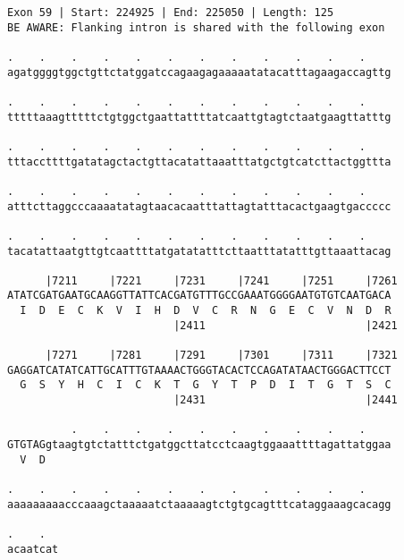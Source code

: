 \documentclass{article}
\begin{document}
\newpage
\begin{Verbatim}
Exon 59 | Start: 224925 | End: 225050 | Length: 125
BE AWARE: Flanking intron is shared with the following exon
 
.    .    .    .    .    .    .    .    .    .    .    .    
agatggggtggctgttctatggatccagaagagaaaaatatacatttagaagaccagttg
  
.    .    .    .    .    .    .    .    .    .    .    .    
tttttaaagtttttctgtggctgaattattttatcaattgtagtctaatgaagttatttg
  
.    .    .    .    .    .    .    .    .    .    .    .    
tttaccttttgatatagctactgttacatattaaatttatgctgtcatcttactggttta
  
.    .    .    .    .    .    .    .    .    .    .    .    
atttcttaggcccaaaatatagtaacacaatttattagtatttacactgaagtgaccccc
  
.    .    .    .    .    .    .    .    .    .    .    .    
tacatattaatgttgtcaattttatgatatatttcttaatttatatttgttaaattacag
  
      |7211     |7221     |7231     |7241     |7251     |7261
ATATCGATGAATGCAAGGTTATTCACGATGTTTGCCGAAATGGGGAATGTGTCAATGACA
  I  D  E  C  K  V  I  H  D  V  C  R  N  G  E  C  V  N  D  R
                          |2411                         |2421
  
      |7271     |7281     |7291     |7301     |7311     |7321
GAGGATCATATCATTGCATTTGTAAAACTGGGTACACTCCAGATATAACTGGGACTTCCT
  G  S  Y  H  C  I  C  K  T  G  Y  T  P  D  I  T  G  T  S  C
                          |2431                         |2441
  
          .    .    .    .    .    .    .    .    .    .    
GTGTAGgtaagtgtctatttctgatggcttatcctcaagtggaaattttagattatggaa
  V  D                                                      
  
.    .    .    .    .    .    .    .    .    .    .    .    
aaaaaaaaacccaaagctaaaaatctaaaaagtctgtgcagtttcataggaaagcacagg
  
.    .  
acaatcat
\end{Verbatim}
\newpage
\end{document}
